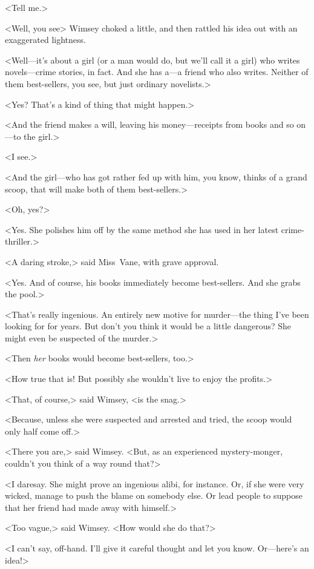<Tell me.>

<Well, you see\longdash> Wimsey choked a little, and then rattled his idea out with an exaggerated lightness.

<Well—it's about a girl (or a man would do, but we'll call it a girl) who writes novels—crime stories, in fact. And she has a—a friend who also writes. Neither of them best-sellers, you see, but just ordinary novelists.>

<Yes? That's a kind of thing that might happen.>

<And the friend makes a will, leaving his money—receipts from books and so on—to the girl.>

<I see.>

<And the girl—who has got rather fed up with him, you know, thinks of a grand scoop, that will make both of them best-sellers.>

<Oh, yes?>

<Yes. She polishes him off by the same method she has used in her latest crime-thriller.>

<A daring stroke,> said Miss~Vane, with grave approval.

<Yes. And of course, his books immediately become best-sellers. And she grabs the pool.>

<That's really ingenious. An entirely new motive for murder—the thing I've been looking for for years. But don't you think it would be a little dangerous? She might even be suspected of the murder.>

<Then \emph{her} books would become best-sellers, too.>

<How true that is! But possibly she wouldn't live to enjoy the profits.>

<That, of course,> said Wimsey, <is the snag.>

<Because, unless she were suspected and arrested and tried, the scoop would only half come off.>

<There you are,> said Wimsey. <But, as an experienced mystery-monger, couldn't you think of a way round that?>

<I daresay. She might prove an ingenious alibi, for instance. Or, if she were very wicked, manage to push the blame on somebody else. Or lead people to suppose that her friend had made away with himself.>

<Too vague,> said Wimsey. <How would she do that?>

<I can't say, off-hand. I'll give it careful thought and let you know. Or—here's an idea!>

